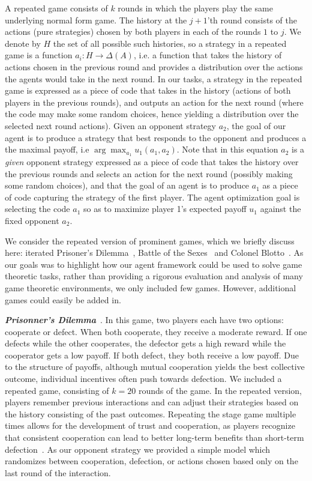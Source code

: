 \documentclass[]{fairmeta}
\newcommand{\ibold}[1]{\textbf{\textit{#1}}}
\begin{document}
A repeated game consists of $k$ rounds in which the players play the same underlying normal form game.
The history at the $j+1$'th round consists of the actions (pure strategies) chosen by both players in each of the rounds $1$ to $j$.
We denote by $H$ the set of all possible such histories, so a strategy in a repeated game is a function $a_i : H \rightarrow \Delta(A)$, i.e. a function that takes the history of actions chosen in the previous round and provides a distribution over the actions the agents would take in the next round.
In our tasks, a strategy in the repeated game is expressed as a piece of code that takes in the history (actions of both players in the previous rounds), and outputs an action for the next round (where the code may make some random choices, hence yielding a distribution over the selected next round actions).
Given an opponent strategy $a_2$, the goal of our agent is to produce a strategy that best responds to the opponent and produces a the maximal payoff, i.e $\arg \max_{a_1} u_1(a_1, a_2)$.
Note that in this equation $a_2$ is a {\it given} opponent strategy expressed as a piece of code that takes the history over the previous rounds and selects an action for the next round (possibly making some random choices), and that the goal of an agent is to produce $a_1$ as a piece of code capturing the strategy of the first player.
The agent optimization goal is selecting the code $a_1$ so as to maximize player 1's expected payoff $u_1$ against the fixed opponent $a_2$.

We consider the repeated version of prominent games, which we briefly discuss here: iterated Prisoner's Dilemma~\citep{flood1958some,fudenberg1991game,axelrod1980effective}, Battle of the Sexes~\citep{cooper1989communication,luce2012games} and Colonel Blotto~\citep{roberson2006colonel}. As our goals was to highlight how our agent framework could be used to solve game theoretic tasks, rather than providing a rigorous evaluation and analysis of many game theoretic environments, we only included few games. However, additional games could easily be added in.

\ibold{Prisonner's Dilemma}~\citep{axelrod1980effective}. In this game, two players each have two options: cooperate or defect. When both cooperate, they receive a moderate reward. If one defects while the other cooperates, the defector gets a high reward while the cooperator gets a low payoff. If both defect, they both receive a low payoff. Due to the structure of payoffs, although mutual cooperation yields the best collective outcome, individual incentives often push towards defection. We included a repeated game, consisting of $k=20$ rounds of the game. In the repeated version, players remember previous interactions and can adjust their strategies based on the history consisting of the past outcomes. Repeating the stage game multiple times allows for the development of trust and cooperation, as players recognize that consistent cooperation can lead to better long-term benefits than short-term defection~\citep{axelrod1980effective}. As our opponent strategy we provided a simple model which randomizes between cooperation, defection, or actions chosen based only on the last round of the interaction. 
\end{document}
